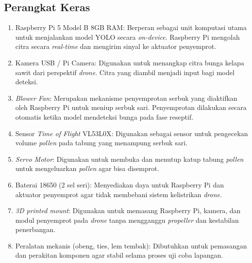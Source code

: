 \subsection{Perangkat Keras}
\label{subsec:perangkat-keras}
\begin{enumerate}
  \item Raspberry Pi 5 Model B 8GB RAM: Berperan sebagai unit komputasi utama untuk menjalankan model YOLO secara \emph{on-device}. Raspberry Pi mengolah citra secara \emph{real-time} dan mengirim sinyal ke aktuator penyemprot.
  \item Kamera USB / Pi Camera: Digunakan untuk menangkap citra bunga kelapa sawit dari perspektif \emph{drone}. Citra yang diambil menjadi input bagi model deteksi.
  \item \emph{Blower Fan}: Merupakan mekanisme penyemprotan serbuk yang diaktifkan oleh Raspberry Pi untuk meniup serbuk sari. Penyemprotan dilakukan secara otomatis ketika model mendeteksi bunga pada fase reseptif.
  \item Sensor \emph{Time of Flight} VL53L0X: Digunakan sebagai sensor untuk pengecekan volume \emph{pollen} pada tabung yang menampung serbuk sari.
  \item \emph{Servo Motor}: Digunakan untuk membuka dan menutup katup tabung \emph{pollen} untuk mengeluarkan \emph{pollen} agar bisa disemprot.
  \item Baterai 18650 (2 sel seri): Menyediakan daya untuk Raspberry Pi dan aktuator penyemprot agar tidak membebani sistem kelistrikan \emph{drone}.
  \item \emph{3D printed mount}: Digunakan untuk memasang Raspberry Pi, kamera, dan modul penyemprot pada \emph{drone} tanpa mengganggu \emph{propeller} dan kestabilan penerbangan.
  \item Peralatan mekanis (obeng, ties, lem tembak): Dibutuhkan untuk pemasangan dan perakitan komponen agar stabil selama proses uji coba lapangan.
\end{enumerate}

